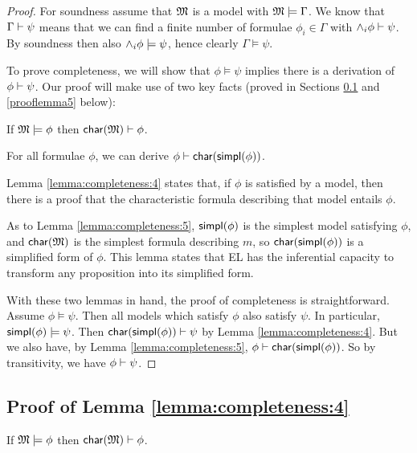 \begin{proof}
For soundness assume that $\frak{M}$ is a model with $\frak{M} \models
\Gamma$.  We know that $\Gamma \vdash \psi$ means that we can find a
finite number of formulae $\phi_i \in \Gamma$ with $\land_i \phi \vdash
\psi$.  By soundness then also $\land_i \phi \models \psi$, hence
clearly $\Gamma \models \psi$.

\NI To prove completeness,  we will show that $\phi
\models \psi$ implies there is a derivation of $\phi \vdash \psi$.  Our proof
will make use of two key facts (proved in Sections \ref{prooflemma4} and \ref{prooflemma5} below):

\begin{lemma}\label{lemma:completeness:4}
If $\frak{M} \models \phi$ then $\mathsf{char}(\frak{M}) \vdash \phi$.
\end{lemma}

\begin{lemma}\label{lemma:completeness:5}
For all formulae $\phi$, we can derive $\phi \vdash \mathsf{char}(\mathsf{simpl}(\phi))$.
\end{lemma}

Lemma \ref{lemma:completeness:4} states that, if $\phi$ is satisfied by a model, then there is a proof that the characteristic formula describing that model entails $\phi$.

As to Lemma \ref{lemma:completeness:5}, $\mathsf{simpl}(\phi)$ is the simplest model
satisfying $\phi$, and $\mathsf{char}(\frak{M})$ is the simplest formula describing
$m$, so $\mathsf{char}(\mathsf{simpl}(\phi))$ is a simplified form of $\phi$. This lemma
states that EL has the inferential capacity to transform any
proposition into its simplified form.

With these two lemmas in hand, the proof of completeness is
straightforward.  Assume $\phi \models \psi$.  Then all models which satisfy
$\phi$ also satisfy $\psi$.  In particular, $\mathsf{simpl}(\phi) \models \psi$.  Then
$\mathsf{char}(\mathsf{simpl}(\phi)) \vdash \psi$ by Lemma \ref{lemma:completeness:4}.  But we
also have, by Lemma \ref{lemma:completeness:5}, $\phi \vdash
\mathsf{char}(\mathsf{simpl}(\phi)) $.  So by transitivity, we have $\phi \vdash \psi$.  

\end{proof}

\subsection{Proof of Lemma \ref{lemma:completeness:4}}
\label{prooflemma4}
If $\frak{M}\models \phi$ then $\mathsf{char}(\frak{M}) \vdash \phi$.

